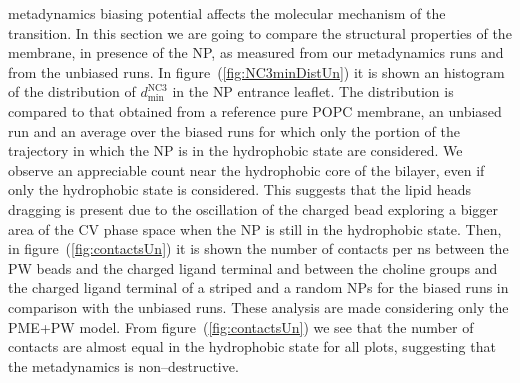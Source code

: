 metadynamics biasing potential affects the molecular mechanism of the transition. In this section we are going to compare the structural properties of the membrane, in presence of the \ac{NP}, as measured from our metadynamics runs and from the unbiased runs. In figure~(\ref{fig:NC3minDistUn}) it is shown an histogram of the distribution of $d_\text{min}^{\text{NC}3}$ in the \ac{NP} entrance leaflet. The distribution is compared to that obtained from a reference pure \ac{POPC} membrane, an unbiased run and an average over the biased runs for which only the portion of the trajectory in which the \ac{NP} is in the hydrophobic state are considered. We observe an appreciable count near the hydrophobic core of the bilayer, even if only the hydrophobic state is considered. This suggests that the lipid heads dragging is present due to the oscillation of the charged bead exploring a bigger area of the \ac{CV} phase space when the \ac{NP} is still in the hydrophobic state. Then, in figure~(\ref{fig:contactsUn}) it is shown the number of contacts per ns between the \ac{PW} beads and the charged ligand terminal and between the choline groups and the charged ligand terminal of a striped and a random \acp{NP} for the biased runs in comparison with the unbiased runs. These analysis are made considering only the \ac{PME}+\ac{PW} model. From figure~(\ref{fig:contactsUn}) we see that the number of contacts are almost equal in the hydrophobic state for all plots, suggesting that the metadynamics is non--destructive.
